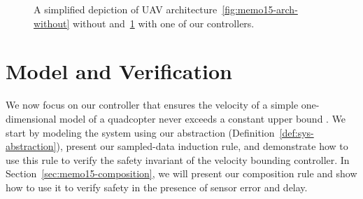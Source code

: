 \begin{figure}[t]
\begin{subfigure}[t]{.49\linewidth}
  \caption{}
  \label{fig:memo15-arch-with}
\end{subfigure}

\caption{A simplified depiction of UAV architecture~\ref{fig:memo15-arch-without} without and~\ref{fig:memo15-arch-with} with one of our controllers.}
\label{fig:arch-shim}
\end{figure}

\section{Model and Verification}
\label{sec:memo15-model}
We now focus on our controller that ensures the velocity of a simple
one-dimensional model of a quadcopter never exceeds a constant upper bound
\ub{}. We start by modeling the system using our abstraction \SysA{}
(Definition~\ref{def:sys-abstraction}), present our sampled-data induction
rule, and demonstrate how to use this rule to verify the safety invariant
of the velocity bounding controller. In
Section~\ref{sec:memo15-composition}, we will present our composition rule
and show how to use it to verify safety in the presence of sensor error and
delay.

